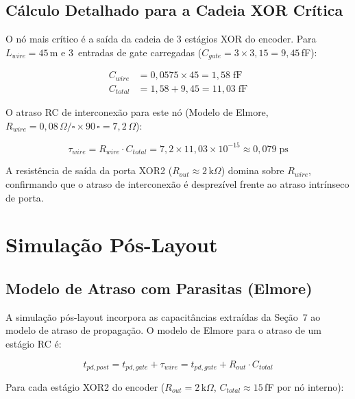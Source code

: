 \documentclass[12pt,a4paper]{article}
\begin{document}
\subsection{Cálculo Detalhado para a Cadeia XOR Crítica}

O nó mais crítico é a saída da cadeia de 3 estágios XOR do encoder. Para $L_{wire} = 45$\,\textmu m e 3~entradas de gate carregadas ($C_{gate} = 3 \times 3{,}15 = 9{,}45$\,fF):

\begin{align*}
  C_{wire} &= 0{,}0575 \times 45 = 1{,}58\;\text{fF} \\
  C_{total} &= 1{,}58 + 9{,}45 = 11{,}03\;\text{fF}
\end{align*}

O atraso RC de interconexão para este nó (Modelo de Elmore, $R_{wire} = 0{,}08\,\Omega/\square \times 90\,\square = 7{,}2\,\Omega$):

\[
  \tau_{wire} = R_{wire} \cdot C_{total} = 7{,}2 \times 11{,}03 \times 10^{-15}
              \approx 0{,}079\;\text{ps}
\]

A resistência de saída da porta XOR2 ($R_{out} \approx 2\,\text{k}\Omega$) domina sobre $R_{wire}$, confirmando que o atraso de interconexão é desprezível frente ao atraso intrínseco de porta.

\section{Simulação Pós-Layout}

\subsection{Modelo de Atraso com Parasitas (Elmore)}

A simulação pós-layout incorpora as capacitâncias extraídas da Seção~7 ao modelo de atraso de propagação. O modelo de Elmore para o atraso de um estágio RC é:

\begin{equation}
  t_{pd,post} = t_{pd,gate} + \tau_{wire} = t_{pd,gate} + R_{out} \cdot C_{total}
  \label{eq:elmore}
\end{equation}

Para cada estágio XOR2 do encoder ($R_{out} = 2\,\text{k}\Omega$, $C_{total} \approx 15$\,fF por nó interno):
\end{document}
